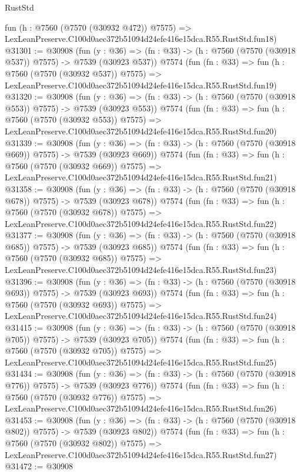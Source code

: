 \begin{lexlean}{RustStd}
\begin{coremodule}
    fun (h : @7560 (@7570 (@30932 @472)) @7575) =>
    LexLeanPreserve.C100d0aec372b51094d24efe416e15dca.R55.RustStd.fun18)
@31301 := @30908
    (fun (y : @36) => (fn : @33) -> (h : @7560 (@7570 (@30918 @537)) @7575) -> @7539 (@30923 @537))
    @7574
    (fun (fn : @33) =>
    fun (h : @7560 (@7570 (@30932 @537)) @7575) =>
    LexLeanPreserve.C100d0aec372b51094d24efe416e15dca.R55.RustStd.fun19)
@31320 := @30908
    (fun (y : @36) => (fn : @33) -> (h : @7560 (@7570 (@30918 @553)) @7575) -> @7539 (@30923 @553))
    @7574
    (fun (fn : @33) =>
    fun (h : @7560 (@7570 (@30932 @553)) @7575) =>
    LexLeanPreserve.C100d0aec372b51094d24efe416e15dca.R55.RustStd.fun20)
@31339 := @30908
    (fun (y : @36) => (fn : @33) -> (h : @7560 (@7570 (@30918 @669)) @7575) -> @7539 (@30923 @669))
    @7574
    (fun (fn : @33) =>
    fun (h : @7560 (@7570 (@30932 @669)) @7575) =>
    LexLeanPreserve.C100d0aec372b51094d24efe416e15dca.R55.RustStd.fun21)
@31358 := @30908
    (fun (y : @36) => (fn : @33) -> (h : @7560 (@7570 (@30918 @678)) @7575) -> @7539 (@30923 @678))
    @7574
    (fun (fn : @33) =>
    fun (h : @7560 (@7570 (@30932 @678)) @7575) =>
    LexLeanPreserve.C100d0aec372b51094d24efe416e15dca.R55.RustStd.fun22)
@31377 := @30908
    (fun (y : @36) => (fn : @33) -> (h : @7560 (@7570 (@30918 @685)) @7575) -> @7539 (@30923 @685))
    @7574
    (fun (fn : @33) =>
    fun (h : @7560 (@7570 (@30932 @685)) @7575) =>
    LexLeanPreserve.C100d0aec372b51094d24efe416e15dca.R55.RustStd.fun23)
@31396 := @30908
    (fun (y : @36) => (fn : @33) -> (h : @7560 (@7570 (@30918 @693)) @7575) -> @7539 (@30923 @693))
    @7574
    (fun (fn : @33) =>
    fun (h : @7560 (@7570 (@30932 @693)) @7575) =>
    LexLeanPreserve.C100d0aec372b51094d24efe416e15dca.R55.RustStd.fun24)
@31415 := @30908
    (fun (y : @36) => (fn : @33) -> (h : @7560 (@7570 (@30918 @705)) @7575) -> @7539 (@30923 @705))
    @7574
    (fun (fn : @33) =>
    fun (h : @7560 (@7570 (@30932 @705)) @7575) =>
    LexLeanPreserve.C100d0aec372b51094d24efe416e15dca.R55.RustStd.fun25)
@31434 := @30908
    (fun (y : @36) => (fn : @33) -> (h : @7560 (@7570 (@30918 @776)) @7575) -> @7539 (@30923 @776))
    @7574
    (fun (fn : @33) =>
    fun (h : @7560 (@7570 (@30932 @776)) @7575) =>
    LexLeanPreserve.C100d0aec372b51094d24efe416e15dca.R55.RustStd.fun26)
@31453 := @30908
    (fun (y : @36) => (fn : @33) -> (h : @7560 (@7570 (@30918 @802)) @7575) -> @7539 (@30923 @802))
    @7574
    (fun (fn : @33) =>
    fun (h : @7560 (@7570 (@30932 @802)) @7575) =>
    LexLeanPreserve.C100d0aec372b51094d24efe416e15dca.R55.RustStd.fun27)
@31472 := @30908

\end{coremodule}
\end{lexlean}
